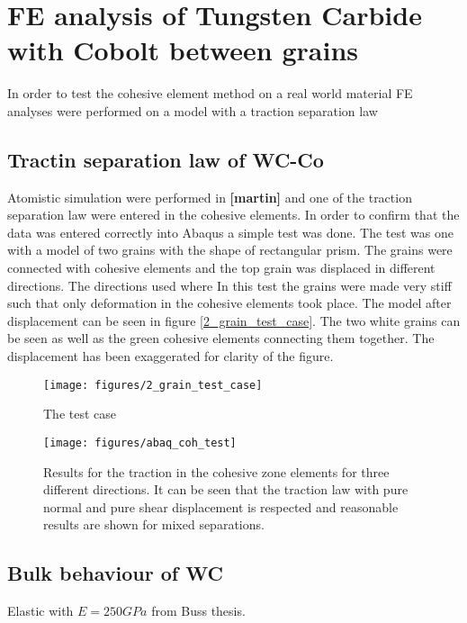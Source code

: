 \documentclass[wcco.tex]{subfiles}
\begin{document}
\FloatBarrier


\section{FE analysis of Tungsten Carbide with Cobolt between grains }

In order to test the cohesive element method on a real world material FE analyses were performed on a model with a traction separation law

\subsection{Tractin separation law of WC-Co}

Atomistic simulation were performed in \textbf{[martin]} and one of the traction separation law were entered in the cohesive elements. In order to confirm that the data was entered correctly into Abaqus a simple test was done. The test was one with a model of two grains with the shape of rectangular prism. The grains were connected with cohesive elements and the top grain was displaced in different directions. The directions used where  In this test the grains were made very stiff such that only deformation in the cohesive elements took place. The model after displacement can be seen in figure \ref{2_grain_test_case}. The two white grains can be seen as well as the green cohesive elements connecting them together. The displacement has been exaggerated for clarity of the figure.

\begin{figure}[ht]
\centering
\texttt{[image: figures/2\_grain\_test\_case]}
\caption{The test case}
\label{fig:2_grain_test_case}
\end{figure}


\begin{figure}[ht]
\centering
\texttt{[image: figures/abaq\_coh\_test]}
\caption{Results for the traction in the cohesive zone elements for three different directions. It can be seen that the traction law with pure normal and pure shear displacement is respected and reasonable results are shown for mixed separations. }
\label{fig:test_cases}
\end{figure}

\subsection{Bulk behaviour of WC}

Elastic with $E = 250GPa$ from Buss thesis.
\end{document}
